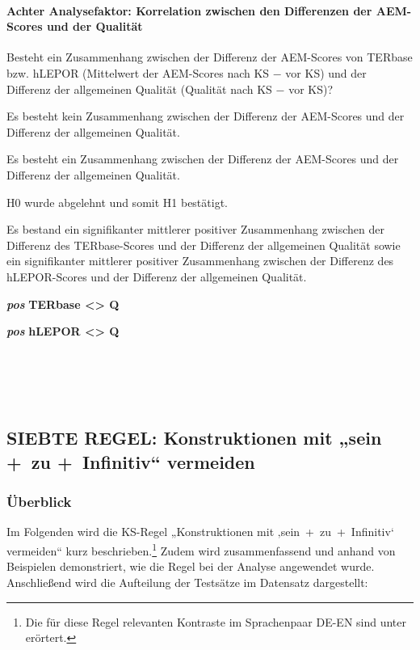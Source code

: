 \paragraph*{Achter Analysefaktor: Korrelation zwischen den Differenzen der AEM-Scores und der Qualität}
\begin{description}[font=\normalfont\bfseries]
\item [Fragestellung:] Besteht ein Zusammenhang zwischen der Differenz der AEM-Scores von TERbase bzw. hLEPOR (Mittelwert der AEM-Scores nach KS $-$ vor KS) und der Differenz der allgemeinen Qualität (Qualität nach KS $-$ vor KS)?
\item [H0 --] Es besteht kein Zusammenhang zwischen der Differenz der AEM-Scores und der Differenz der allgemeinen Qualität.
\item [H1 --] Es besteht ein Zusammenhang zwischen der Differenz der AEM-Scores und der Differenz der allgemeinen Qualität.
\item [Resultat]
\end{description}
\noindent
\parbox[t]{.7\textwidth}{
H0 wurde abgelehnt und somit H1 bestätigt.

Es bestand ein signifikanter mittlerer positiver Zusammenhang zwischen der Differenz des TERbase-Scores und der Differenz der allgemeinen Qualität sowie ein signifikanter mittlerer positiver Zusammenhang zwischen der Differenz des hLEPOR-Scores und der Differenz der allgemeinen Qualität.
}
\parbox[t]{.04\textwidth}{}
\colorbox{smGreen}{\parbox[t]{.25\textwidth}{
{ \textbf{\textit{pos}} \textbf{TERbase <> Q}}

 \textbf{\textit{pos}} \textbf{hLEPOR <> Q}\\
 \\
 \\
 \\
 \\
}}




\subsection{SIEBTE REGEL: Konstruktionen mit „sein +~zu +~Infinitiv“ vermeiden}
\label{sec:5.3.7}

\subsubsection{\label{sec:5.3.7.0}Überblick}

Im Folgenden wird die KS-Regel „Konstruktionen mit ‚sein~+~zu~+~Infinitiv‘ vermeiden“ kurz beschrieben.\footnote{\textrm{Die für diese Regel relevanten Kontraste im Sprachenpaar DE-EN sind unter  erörtert.} } Zudem wird zusammenfassend und anhand von Beispielen demonstriert, wie die Regel bei der Analyse angewendet wurde. Anschließend wird die Aufteilung der Testsätze im Datensatz dargestellt:

